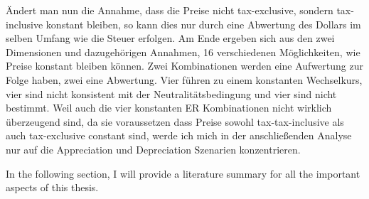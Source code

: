 Ändert man nun die Annahme, dass die Preise nicht tax-exclusive, sondern tax-inclusive konstant bleiben, so kann dies nur durch eine Abwertung des Dollars im selben Umfang wie die Steuer erfolgen. 
Am Ende ergeben sich aus den zwei Dimensionen und dazugehörigen Annahmen, 16 verschiedenen Möglichkeiten, wie Preise konstant bleiben können. Zwei Kombinationen werden eine Aufwertung zur Folge haben, zwei eine Abwertung. Vier führen zu einem konstanten Wechselkurs, vier sind nicht konsistent mit der Neutralitätsbedingung und vier sind nicht bestimmt. Weil auch die vier konstanten ER Kombinationen nicht wirklich überzeugend sind, da sie voraussetzen dass Preise sowohl tax-tax-inclusive als auch tax-exclusive constant sind, werde ich mich in der anschließenden Analyse nur auf die Appreciation und Depreciation Szenarien konzentrieren. 


In the following section, I will provide a literature summary for all the important aspects of this thesis. \\

